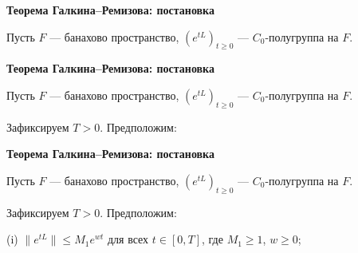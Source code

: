 \documentclass[11pt]{article}
\begin{document}
\newpage

\begin{center}
{\color{notaeYELLOW}\bfseries\fontsize{44}{52}\selectfont Теорема Галкина--Ремизова: постановка}
\end{center}
\vspace*{\fill}
\begin{center}
\fontsize{36}{43}\selectfont
\parbox{\linewidth}{\centering\noindent Пусть $F$ --- банахово пространство, $(e^{tL})_{t\ge0}$ --- $C_0$-полугруппа на $F$.
\par}\vspace{0.4in}
\end{center}
\vspace*{\fill}

\newpage

\begin{center}
{\color{notaeYELLOW}\bfseries\fontsize{44}{52}\selectfont Теорема Галкина--Ремизова: постановка}
\end{center}
\vspace*{\fill}
\begin{center}
\fontsize{36}{43}\selectfont
\parbox{\linewidth}{\centering\noindent Пусть $F$ --- банахово пространство, $(e^{tL})_{t\ge0}$ --- $C_0$-полугруппа на $F$.
\par}\vspace{0.4in}
\parbox{\linewidth}{\centering\noindent Зафиксируем $T>0$. Предположим:
\par}\vspace{0.4in}
\end{center}
\vspace*{\fill}

\newpage

\begin{center}
{\color{notaeYELLOW}\bfseries\fontsize{44}{52}\selectfont Теорема Галкина--Ремизова: постановка}
\end{center}
\vspace*{\fill}
\begin{center}
\fontsize{36}{43}\selectfont
\parbox{\linewidth}{\centering\noindent Пусть $F$ --- банахово пространство, $(e^{tL})_{t\ge0}$ --- $C_0$-полугруппа на $F$.
\par}\vspace{0.4in}
\parbox{\linewidth}{\centering\noindent Зафиксируем $T>0$. Предположим:
\par}\vspace{0.4in}
\parbox{\linewidth}{\centering\noindent (i) $\|e^{tL}\|\le M_1e^{wt}$ для всех $t\in[0,T]$, где $M_1\ge1$, $w\ge0$;
\par}\vspace{0.4in}
\end{center}
\vspace*{\fill}
\end{document}
